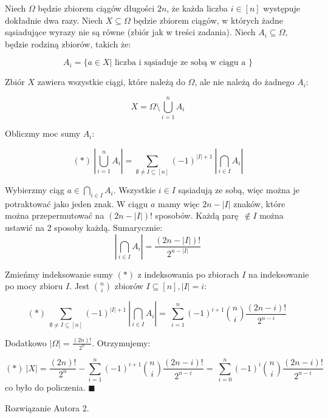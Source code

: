 \documentclass{mwart}
\begin{document}
\begin{mdframed}

    Niech $\Omega$ będzie zbiorem ciągów długości $2n$, że każda liczba $i \in [n]$ 
    występuje dokładnie dwa razy. 
    Niech $X \subseteq \Omega$ będzie zbiorem ciągów, w których żadne sąsiadujące wyrazy 
    nie są równe (zbiór jak w treści zadania).
    Niech $A_i \subseteq \Omega$, będzie rodziną zbiorów, 
    takich że:

    $$ A_i = \{a \in X \vert\text{ liczba i sąsiaduje ze sobą w ciągu a }\} $$
    
    Zbiór $X$ zawiera wszystkie ciągi, które należą do $\Omega$, ale nie należą do żadnego
    $A_i$:

    $$ X = \Omega \setminus \bigcup_{i = 1}^{n} A_i$$
    
    Obliczmy moc sumy $A_i$:
    
    $$ (*) \
    |\bigcup_{i = 1}^{n} A_i| = \sum_{\emptyset\neq I \subseteq [n]} (-1)^{|I| + 1} \
    |\bigcap_{i \in I} A_i|
    $$

    Wybierzmy ciąg $a \in \bigcap_{i \in I} A_i$. Wszystkie $i \in I$ sąsiadują ze sobą, 
    więc można je potraktować jako jeden znak. W ciągu $a$ mamy więc $2n - |I|$ znaków, 
    które można przepermutować na $(2n - |I|)!$ sposobów. Każdą parę $\notin I$ można ustawić na 2 
    sposoby każdą. Sumarycznie:
    $$\
    |\bigcap_{i \in I} A_i| = \frac{(2n - |I|)!}{2^{n - |I|}}\
    $$

    Zmieńmy indeksowanie sumy $(*)$ z indeksowania po zbiorach $I$ na indeksowanie po mocy zbioru $I$. 
    Jest $\binom{n}{i}$ zbiorów $I \subseteq [n], |I| = i$:

    $$(*)\
    \sum_{\emptyset\neq I \subseteq [n]} (-1)^{|I| + 1} \
    |\bigcap_{i \in I} A_i| = \
    \sum_{i = 1}^{n} (-1)^{i + 1} \binom{n}{i} \frac{(2n - i)!}{2^{n - i}}\
    $$

    Dodatkowo $|\Omega| = \frac{(2n)!}{2^{n}}$. Otrzymujemy:

    $$(*)\
    |X| = \frac{(2n)!}{2^{n}} - \sum_{i = 1}^{n} (-1)^{i + 1} \binom{n}{i} \frac{(2n - i)!}{2^{n - i}} = \
    \sum_{i = 0}^{n} (-1)^{i} \binom{n}{i} \frac{(2n - i)!}{2^{n - i}} \
    $$
    co było do policzenia. $\blacksquare$


\end{mdframed}

\begin{mdframed}
    Rozwiązanie Autora 2.
\end{mdframed}
\end{document}
